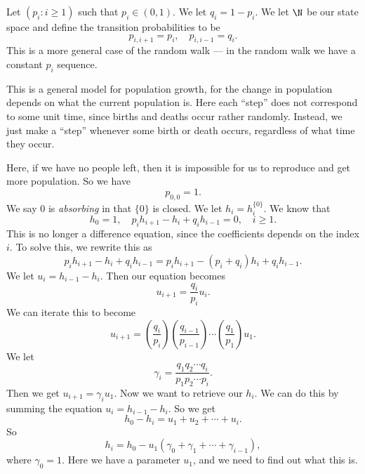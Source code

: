 \documentclass[a4paper]{article}
\begin{document}
\begin{eg}
  Let $(p_i: i \geq 1)$ such that $p_i \in (0, 1)$. We let $q_i = 1 - p_i$. We let $\N$ be our state space and define the transition probabilities to be
  \[
    p_{i, i + 1} = p_i,\quad p_{i, i - 1} = q_i.
  \]
  This is a more general case of the random walk --- in the random walk we have a constant $p_i$ sequence.

  This is a general model for population growth, for the change in population depends on what the current population is. Here each ``step'' does not correspond to some unit time, since births and deaths occur rather randomly. Instead, we just make a ``step'' whenever some birth or death occurs, regardless of what time they occur.

  Here, if we have no people left, then it is impossible for us to reproduce and get more population. So we have
  \[
    p_{0, 0} = 1.
  \]
  We say $0$ is \emph{absorbing} in that $\{0\}$ is closed. We let $h_i = h_i^{\{0\}}$. We know that
  \[
    h_0 = 1,\quad p_i h_{i + 1} - h_i + q_i h_{i - 1} = 0,\quad i \geq 1.
  \]
  This is no longer a difference equation, since the coefficients depends on the index $i$. To solve this, we rewrite this as
  \[
    p_i h_{i + 1} - h_i + q_i h_{i - 1} = p_i h_{i + 1} - (p_i + q_i) h_i + q_i h_{i - 1}.
  \]
  We let $u_i = h_{i - 1} - h_i$. Then our equation becomes
  \[
    u_{i + 1} = \frac{q_i}{p_i} u_i.
  \]
  We can iterate this to become
  \[
    u_{i + 1} = \left(\frac{q_i}{p_i}\right)\left(\frac{q_{i - 1}}{p_{i - 1}}\right) \cdots \left(\frac{q_1}{p_1}\right) u_1.
  \]
  We let
  \[
    \gamma_i = \frac{q_1q_2\cdots q_i}{p_1p_2\cdots p_i}.
  \]
  Then we get $u_{i + 1} = \gamma_i u_1$. Now we want to retrieve our $h_i$. We can do this by summing the equation $u_i = h_{i - 1} - h_i$. So we get
  \[
    h_0 - h_i = u_1 + u_2 + \cdots + u_i.
  \]
  So
  \[
    h_i = h_0 - u_1(\gamma_0 + \gamma_1 + \cdots + \gamma_{i - 1}),
  \]
  where $\gamma_0 = 1$. Here we have a parameter $u_1$, and we need to find out what this is.
\end{eg}
\end{document}
